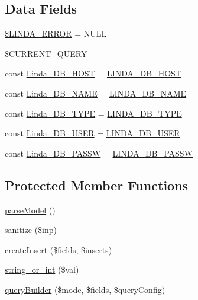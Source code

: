 \subsection*{Data Fields}
\begin{DoxyCompactItemize}
\item 
\hyperlink{class_linda_ab7d7da38a7a04e1f95bc46697f8d80e3}{\$\+L\+I\+N\+D\+A\+\_\+\+E\+R\+R\+O\+R} = N\+U\+L\+L
\item 
\hyperlink{class_linda_a5ed9b689dc54a1e48103d904af6885a5}{\$\+C\+U\+R\+R\+E\+N\+T\+\_\+\+Q\+U\+E\+R\+Y}
\item 
const \hyperlink{class_linda_a4771733014ade9011a85f4d01b24f2fe}{Linda\+\_\+\+D\+B\+\_\+\+H\+O\+S\+T} = \hyperlink{_linda_8inc_a86b40c589d474db371ea58296a5eeb12}{L\+I\+N\+D\+A\+\_\+\+D\+B\+\_\+\+H\+O\+S\+T}
\item 
const \hyperlink{class_linda_aab80e54270eaebb370e54ec5232be43a}{Linda\+\_\+\+D\+B\+\_\+\+N\+A\+M\+E} = \hyperlink{_linda_8inc_a4e480c562d1f6701e89f603607ddbb54}{L\+I\+N\+D\+A\+\_\+\+D\+B\+\_\+\+N\+A\+M\+E}
\item 
const \hyperlink{class_linda_af392abe38a40b56515eb835fa3c39d8c}{Linda\+\_\+\+D\+B\+\_\+\+T\+Y\+P\+E} = \hyperlink{_linda_8inc_a75c0048bcb27b8bf9d4e9fd1b9eb023b}{L\+I\+N\+D\+A\+\_\+\+D\+B\+\_\+\+T\+Y\+P\+E}
\item 
const \hyperlink{class_linda_a73fe432dd03d1c21aa74940da5c04dc0}{Linda\+\_\+\+D\+B\+\_\+\+U\+S\+E\+R} = \hyperlink{_linda_8inc_a713707c7fea371f7f3892136c1e852f0}{L\+I\+N\+D\+A\+\_\+\+D\+B\+\_\+\+U\+S\+E\+R}
\item 
const \hyperlink{class_linda_a392451b719cb6bb9b0c372832ad9e6d8}{Linda\+\_\+\+D\+B\+\_\+\+P\+A\+S\+S\+W} = \hyperlink{_linda_8inc_aef9b254dff90502b875151a93b462df1}{L\+I\+N\+D\+A\+\_\+\+D\+B\+\_\+\+P\+A\+S\+S\+W}
\end{DoxyCompactItemize}
\subsection*{Protected Member Functions}
\begin{DoxyCompactItemize}
\item 
\hyperlink{class_linda_a3749f401c64588bfbecbcc3b2c1a24e4}{parse\+Model} ()
\item 
\hyperlink{class_linda_a0cee7c433eda5db6e7610d4e0dcedf99}{sanitize} (\$inp)
\item 
\hyperlink{class_linda_a190c686da9f77d10964e06f0480c9b44}{create\+Insert} (\$fields, \$inserts)
\item 
\hyperlink{class_linda_a9aa9a275e880b4446ec390cc2ba351cd}{string\+\_\+or\+\_\+int} (\$val)
\item 
\hyperlink{class_linda_aeb66ebf99ca730ea67c612735a6576b4}{query\+Builder} (\$mode, \$fields, \$query\+Config)
\end{DoxyCompactItemize}
